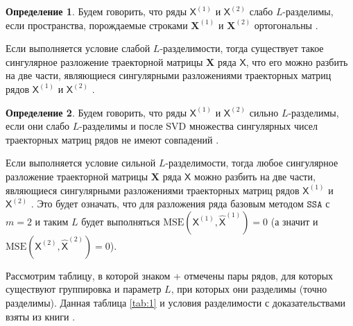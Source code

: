 \documentclass[12pt, specialist, subf
]{disser}
\theoremstyle{definition}
\newcommand{\SSA}{\texttt{SSA}}
\newcommand{\TS}{\mathsf{X}}
\newtheorem{definition}{Определение} %
\begin{document}
\begin{definition}
	Будем говорить, что ряды $\TS^{(1)}$ и $\TS^{(2)}$ слабо $L$-разделимы, если пространства, порождаемые строками $\mathbf{X}^{(1)}$ и $\mathbf{X}^{(2)}$ ортогональны \cite{golyandina2001analysis}.
\end{definition}

Если выполняется условие слабой $L$-разделимости, тогда существует такое сингулярное разложение траекторной матрицы $\mathbf X$ ряда $\TS$, что его можно разбить на две части, являющиеся сингулярными разложениями траекторных матриц рядов $\TS^{(1)}$ и $\TS^{(2)}$ \cite{golyandina2001analysis}.

\begin{definition}
	Будем говорить, что ряды $\TS^{(1)}$ и $\TS^{(2)}$ сильно $L$-разделимы, если они слабо $L$-разделимы и после $\text{SVD}$ множества сингулярных чисел траекторных матриц рядов не имеют совпадений \cite{golyandina2001analysis}.
\end{definition}

Если выполняется условие сильной $L$-разделимости, тогда любое сингулярное разложение траекторной матрицы $\mathbf X$ ряда $\TS$ можно разбить на две части, являющиеся сингулярными разложениями траекторных матриц рядов $\TS^{(1)}$ и $ \TS^{(2)}$ \cite{golyandina2001analysis}. Это будет означать, что для разложения ряда базовым методом $\SSA$ с $m = 2$ и таким $L$ будет выполняться
\( \mathrm{MSE}\left(\TS^{(1)}, \hat{\TS}^{(1)}\right) = 0 \) (а значит и \( \mathrm{MSE}\left(\TS^{(2)}, \hat{\TS}^{(2)}\right) = 0 \)).


Рассмотрим таблицу, в которой знаком + отмечены пары рядов, для которых существуют группировка и параметр $L$, при которых они разделимы (точно разделимы). Данная таблица \ref{tab:1} и условия разделимости с доказательствами взяты из книги \cite{golyandina2001analysis}.

\begin{table}[H]
	\begin{center}
		\caption{Точная разделимость}
		\label{tab:1}
	\end{center}
\end{table}
\end{document}
